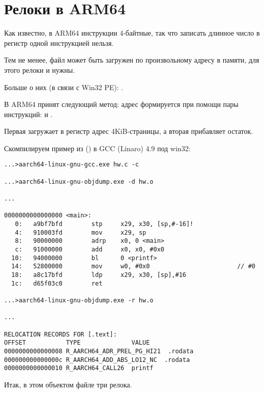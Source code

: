 ﻿\newcommand{\ARMELF}{[\IT{ELF for the ARM 64-bit Architecture (AArch64)}, (2013)]\footnote{\AlsoAvailableAs \url{http://go.yurichev.com/17288}}}

\section{Релоки в ARM64}
\label{ARM64_relocs}

Как известно, в ARM64 инструкции 4-байтные, так что записать длинное число в регистр одной инструкцией нельзя.

Тем не менее, файл может быть загружен по произвольному адресу в памяти, для этого релоки и нужны.

Больше о них (в связи с Win32 PE): .

В ARM64 принят следующий метод: адрес формируется при помощи пары инструкций:  и \ADD.

Первая загружает в регистр адрес 4KiB-страницы, а вторая прибавляет остаток.

Скомпилируем пример из \q{\HelloWorldSectionName} 
() в GCC (Linaro) 4.9 под win32:

\begin{lstlisting}[caption=GCC (Linaro) 4.9 и objdump объектного файла]
...>aarch64-linux-gnu-gcc.exe hw.c -c

...>aarch64-linux-gnu-objdump.exe -d hw.o

...

0000000000000000 <main>:
   0:   a9bf7bfd        stp     x29, x30, [sp,#-16]!
   4:   910003fd        mov     x29, sp
   8:   90000000        adrp    x0, 0 <main>
   c:   91000000        add     x0, x0, #0x0
  10:   94000000        bl      0 <printf>
  14:   52800000        mov     w0, #0x0                        // #0
  18:   a8c17bfd        ldp     x29, x30, [sp],#16
  1c:   d65f03c0        ret

...>aarch64-linux-gnu-objdump.exe -r hw.o

...

RELOCATION RECORDS FOR [.text]:
OFFSET           TYPE              VALUE
0000000000000008 R_AARCH64_ADR_PREL_PG_HI21  .rodata
000000000000000c R_AARCH64_ADD_ABS_LO12_NC  .rodata
0000000000000010 R_AARCH64_CALL26  printf
\end{lstlisting}

Итак, в этом объектом файле три релока.

